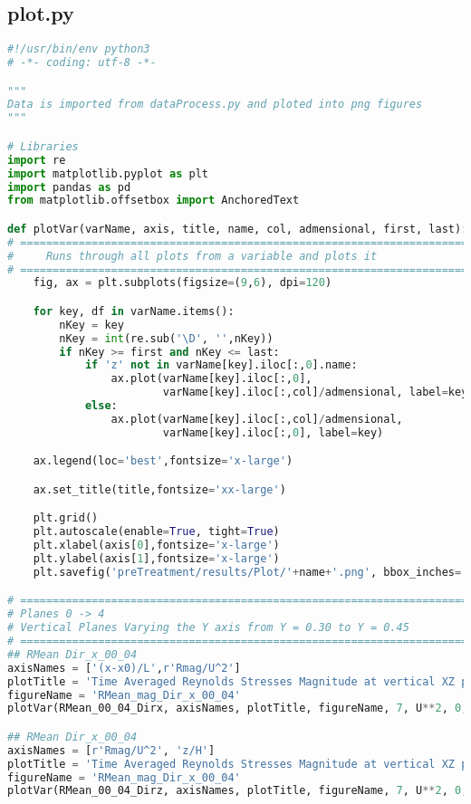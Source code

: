 \documentclass[../main.tex]{subfiles}
\begin{document}
\subsection{plot.py}
\begin{lstlisting}[language=python]
#!/usr/bin/env python3
# -*- coding: utf-8 -*-

"""
Data is imported from dataProcess.py and ploted into png figures
"""

# Libraries
import re
import matplotlib.pyplot as plt
import pandas as pd
from matplotlib.offsetbox import AnchoredText

def plotVar(varName, axis, title, name, col, admensional, first, last):
# =============================================================================
#     Runs through all plots from a variable and plots it
# =============================================================================
    fig, ax = plt.subplots(figsize=(9,6), dpi=120)

    for key, df in varName.items():
        nKey = key
        nKey = int(re.sub('\D', '',nKey))
        if nKey >= first and nKey <= last:
            if 'z' not in varName[key].iloc[:,0].name:
                ax.plot(varName[key].iloc[:,0],
                        varName[key].iloc[:,col]/admensional, label=key)
            else:
                ax.plot(varName[key].iloc[:,col]/admensional,
                        varName[key].iloc[:,0], label=key)

    ax.legend(loc='best',fontsize='x-large')

    ax.set_title(title,fontsize='xx-large')

    plt.grid()
    plt.autoscale(enable=True, tight=True)
    plt.xlabel(axis[0],fontsize='x-large')
    plt.ylabel(axis[1],fontsize='x-large')
    plt.savefig('preTreatment/results/Plot/'+name+'.png', bbox_inches='tight')

# =============================================================================
# Planes 0 -> 4
# Vertical Planes Varying the Y axis from Y = 0.30 to Y = 0.45
# =============================================================================
## RMean Dir_x_00_04
axisNames = ['(x-x0)/L',r'Rmag/U^2']
plotTitle = 'Time Averaged Reynolds Stresses Magnitude at vertical XZ planes'
figureName = 'RMean_mag_Dir_x_00_04'
plotVar(RMean_00_04_Dirx, axisNames, plotTitle, figureName, 7, U**2, 0, 4)

## RMean Dir_x_00_04
axisNames = [r'Rmag/U^2', 'z/H']
plotTitle = 'Time Averaged Reynolds Stresses Magnitude at vertical XZ planes'
figureName = 'RMean_mag_Dir_x_00_04'
plotVar(RMean_00_04_Dirz, axisNames, plotTitle, figureName, 7, U**2, 0, 4)


\end{lstlisting}
\end{document}
